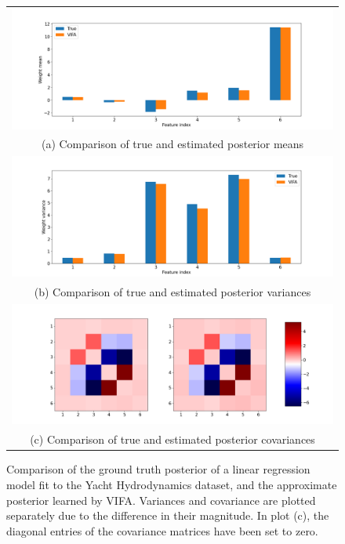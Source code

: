 \documentclass[msc,deptreport.inf]{infthesis} %
\begin{document}
\begin{figure}[!htbp] 
	\begin{tabular}{c}
		\includegraphics[width=140mm]{plots/yacht_hydrodynamics_posterior_mean.png} \\
		(a) Comparison of true and estimated posterior means \\[6pt] 
		 \includegraphics[width=140mm]{plots/yacht_hydrodynamics_posterior_variance.png} \\
		(b) Comparison of true and estimated posterior variances \\[6pt] 
		\includegraphics[width=140mm]{plots/yacht_hydrodynamics_posterior_covariance.png} \\
		(c) Comparison of true and estimated posterior covariances \\[6pt] 
	\end{tabular}
	\caption{Comparison of the ground truth posterior of a linear regression model fit to the Yacht Hydrodynamics dataset, and the approximate posterior learned by VIFA. Variances and covariance are plotted separately due to the difference in their magnitude. In plot (c), the diagonal entries of the covariance matrices have been set to zero.}
	\label{fig:posterior_yacht_hydrodynamics}
\end{figure}
\end{document}
